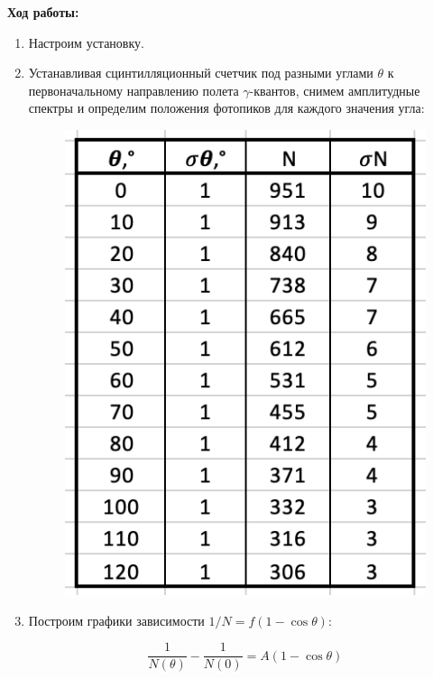 \documentclass[a4paper, 12pt]{article}%
\begin{document}
\textbf{Ход работы:}\\\par

\begin{enumerate}

	\item Настроим установку.
	
	\item Устанавливая сцинтилляционный счетчик под разными углами $\theta$ к первоначальному направлению полета $\gamma$-квантов,  снимем амплитудные спектры и определим положения фотопиков для каждого значения угла:
	
	\begin{figure}[h!]
	    \centering
		\includegraphics[scale=0.7]{Таблица.PNG}
	\end{figure}

	\item Построим графики зависимости $1/N = f(1-\cos \theta)$:
	
    \[\frac{1}{N(\theta)} - \frac{1}{N(0)} = A(1 - \cos \theta)\]
    

\end{enumerate}
\end{document}
